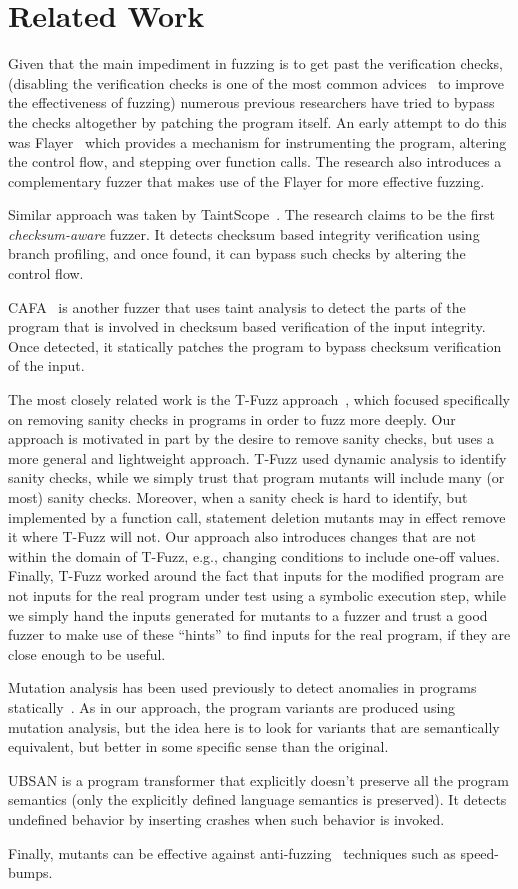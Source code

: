\section{Related Work}

Given that the main impediment in fuzzing is to get past the verification checks,
(disabling the verification checks is one of the most common advices~\cite{chromeadvice}
to improve the effectiveness of fuzzing)
numerous previous researchers have tried to bypass the checks altogether by
patching the program itself.
An early attempt to do this was Flayer~\cite{drewry2O07flayer} which
provides a mechanism for instrumenting the program, altering the control flow,
and stepping over function calls. The research also introduces a complementary
fuzzer that makes use of the Flayer for more effective fuzzing.

Similar approach was taken by TaintScope~\cite{wang2010taintscope}. The research
claims to be the first \emph{checksum-aware} fuzzer. It detects checksum
based integrity verification using branch profiling, and once found, it can
bypass such checks by altering the control flow.

CAFA~\cite{liu2018cafa} is another fuzzer that uses taint analysis to detect the
parts of the program that is involved in checksum based verification of the
input integrity. Once detected, it statically patches the program to bypass
checksum verification of the input.

The most closely related work is the T-Fuzz approach~\cite{tfuzz}, which focused specifically on removing sanity checks in programs in order to fuzz more deeply.  Our approach is motivated in part by the desire to remove sanity checks, but uses a more general and lightweight approach.  T-Fuzz used dynamic analysis to identify sanity checks, while we simply trust that program mutants will include many (or most) sanity checks.  Moreover, when a sanity check is hard to identify, but implemented by a function call, statement deletion mutants may in effect remove it where T-Fuzz will not.  Our approach also introduces changes that are not within the domain of T-Fuzz, e.g., changing conditions to include one-off values.  Finally, T-Fuzz worked around the fact that inputs for the modified program are not inputs for the real program under test using a symbolic execution step, while we simply hand the inputs generated for mutants to a fuzzer and trust a good fuzzer to make use of these ``hints'' to find inputs for the real program, if they are close enough to be useful.

Mutation analysis has been used previously to detect anomalies in programs
statically~\cite{arcaini2017novel}. As in our approach, the program variants
are produced using mutation analysis, but the idea here is to look for variants
that are semantically equivalent, but better in some specific sense than the
original.

UBSAN is a program transformer that explicitly doesn't preserve all the program
semantics (only the explicitly defined language semantics is preserved).
It detects undefined behavior by inserting crashes when such behavior is invoked.

Finally, mutants can be effective against anti-fuzzing~\cite{jung2019fuzzification}
techniques such as speed-bumps.
